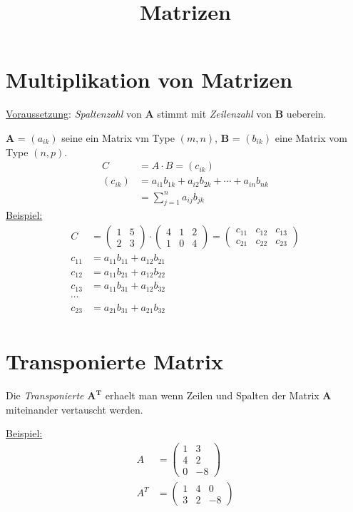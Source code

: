 \documentclass[11pt]{article}
\title{Matrizen}
\begin{document}
\section{Multiplikation von Matrizen}
\underline{Voraussetzung}: \textit{Spaltenzahl} von \textbf{A} stimmt mit \textit{Zeilenzahl} von \textbf{B} ueberein.

\textbf{A} = $( a_{ik})$ seine ein Matrix vm Type $(m, n)$, \textbf{B} = $( b_{ik})$ eine Matrix vom Type $(n,p)$.
\begin{align*}
C &= A \cdot B = \left( c_{ik} \right) \\
\left( c_{ik} \right) &= a_{i1}b_{1k} + a_{i2}b_{2k} + \cdots + a_{in}b_{nk} \\
&= \sum_{j=1}^n{a_{ij}b_{jk}}
\end{align*}
\underline{Beispiel:}
\begin{align*}
C &=
\begin{pmatrix}
1 & 5 \\
2 & 3
\end{pmatrix} \cdot
\begin{pmatrix}
4 & 1 & 2 \\
1 & 0 & 4
\end{pmatrix} =
\begin{pmatrix}
c_{11} & c_{12} & c_{13} \\
c_{21} & c_{22} & c_{23}
\end{pmatrix} \\
c_{11} &= a_{11} b_{11} +  a_{12} b_{21} \\
c_{12} &= a_{11} b_{21} +  a_{12} b_{22} \\
c_{13} &= a_{11} b_{31} +  a_{12} b_{32} \\
\cdots \\
c_{23} &= a_{21} b_{31} +  a_{21} b_{32} \\
\end{align*}


\section{Transponierte Matrix}
Die \textit{Transponierte} $\mathbf{A^T}$ erhaelt man wenn Zeilen und Spalten der Matrix \textbf{A} miteinander vertauscht werden.

\underline{Beispiel:}
\begin{align*}
A &= \begin{pmatrix}
1 & 3 \\
4 & 2 \\
0 & -8
\end{pmatrix} \\
A^T &= \begin{pmatrix}
1 & 4 & 0 \\
3 & 2 & -8
\end{pmatrix}
\end{align*}
\end{document}
